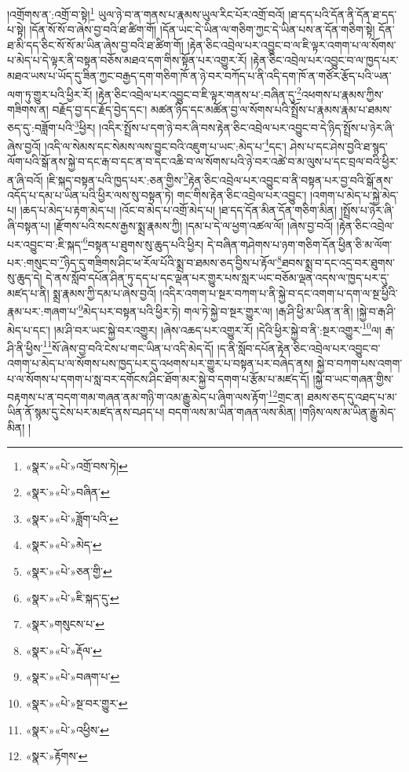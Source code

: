 །འགྲོགས་ན་:འགྲོ་བ་སྟེ།\footnote{«སྣར་»«པེ་»འགྲོ་བས་ཏེ།} ཡུལ་ཉེ་བ་ན་གནས་པ་རྣམས་ཡུལ་རིང་པོར་འགྲོ་བའོ། །ཐ་དད་པའི་དོན་ནི་དོན་ཐ་དད་པ་སྟེ། །དོན་སོ་སོ་བ་ཞེས་བྱ་བའི་ཐ་ཚིག་གོ། །དོན་ཡང་དེ་ཡིན་ལ་གཅིག་ཀྱང་དེ་ཡིན་པས་ན་དོན་གཅིག་སྟེ། དོན་ཐ་མི་དད་ཅིང་སོ་སོ་མ་ཡིན་ཞེས་བྱ་བའི་ཐ་ཚིག་གོ། །རྟེན་ཅིང་འབྲེལ་པར་འབྱུང་བ་ལ་ཇི་ལྟར་འགག་པ་ལ་སོགས་པ་མེད་པ་དེ་ལྟར་ནི་བསྟན་བཅོས་མཐའ་དག་གིས་སྟོན་པར་འགྱུར་རོ། །རྟེན་ཅིང་འབྲེལ་པར་འབྱུང་བ་ལ་ཁྱད་པར་མཐའ་ཡས་པ་ཡོད་དུ་ཟིན་ཀྱང་བརྒྱད་དག་གཅིག་ཁོ་ན་ཉེ་བར་བཀོད་པ་ནི་འདི་དག་ཁོ་ན་གཙོར་རྩོད་པའི་ཡན་ལག་ཏུ་གྱུར་པའི་ཕྱིར་རོ། །རྟེན་ཅིང་འབྲེལ་པར་འབྱུང་བ་ཇི་ལྟར་གནས་པ་:བཞིན་དུ་\footnote{«སྣར་»«པེ་»བཞིན་}འཕགས་པ་རྣམས་ཀྱིས་གཟིགས་ན། བརྗོད་བྱ་དང་རྗོད་བྱེད་དང་། མཚན་ཉིད་དང་མཚོན་བྱ་ལ་སོགས་པའི་སྤྲོས་པ་རྣམས་རྣམ་པ་ཐམས་ཅད་དུ་:བཟློག་པའི་\footnote{«སྣར་»«པེ་»ཟློག་པའི་}ཕྱིར། །འདིར་སྤྲོས་པ་དག་ཉེ་བར་ཞི་བས་རྟེན་ཅིང་འབྲེལ་པར་འབྱུང་བ་དེ་ཉིད་སྤྲོས་པ་ཉེར་ཞི་ཞེས་བྱའོ། །འདི་ལ་སེམས་དང་སེམས་ལས་བྱུང་བའི་འཇུག་པ་ཡང་:མེད་པ་\footnote{«སྣར་»«པེ་»མེད་}དང་། ཤེས་པ་དང་ཤེས་བྱའི་ཐ་སྙད་ལོག་པའི་སྒོ་ནས་སྐྱེ་བ་དང་རྒ་བ་དང་ན་བ་དང་འཆི་བ་ལ་སོགས་པའི་ཉེ་བར་འཚེ་བ་མ་ལུས་པ་དང་བྲལ་བའི་ཕྱིར་ན་ཞི་བའོ། །ཇི་སྐད་བསྟན་པའི་ཁྱད་པར་:ཅན་གྱིས་\footnote{«སྣར་»«པེ་»ཅན་གྱི་}རྟེན་ཅིང་འབྲེལ་པར་འབྱུང་བ་ནི་བསྟན་པར་བྱ་བའི་སྒོ་ནས་འདོད་པ་དམ་པ་ཡིན་པའི་ཕྱིར་ལས་སུ་བསྟན་ཏེ། གང་གིས་རྟེན་ཅིང་འབྲེལ་པར་འབྱུང་། །འགག་པ་མེད་པ་སྐྱེ་མེད་པ། །ཆད་པ་མེད་པ་རྟག་མེད་པ། །འོང་བ་མེད་པ་འགྲོ་མེད་པ། །ཐ་དད་དོན་མིན་དོན་གཅིག་མིན། །སྤྲོས་པ་ཉེར་ཞི་ཞི་བསྟན་པ། །རྫོགས་པའི་སངས་རྒྱས་སྨྲ་རྣམས་ཀྱི། །དམ་པ་དེ་ལ་ཕྱག་འཚལ་ལོ། །ཞེས་བྱ་བའོ། །རྟེན་ཅིང་འབྲེལ་པར་འབྱུང་བ་:ཇི་སྐད་\footnote{«སྣར་»«པེ་»ཇི་སྐད་དུ་}བསྟན་པ་ཐུགས་སུ་ཆུད་པའི་ཕྱིར། དེ་བཞིན་གཤེགས་པ་ཉག་གཅིག་དོན་ཕྱིན་ཅི་མ་ལོག་པར་:གསུང་བ་\footnote{«སྣར་»གསུངས་པ་}ཉིད་དུ་གཟིགས་ཤིང་ཕ་རོལ་པོའི་སྨྲ་བ་ཐམས་ཅད་བྱིས་པ་རྟོལ་\footnote{«སྣར་»«པེ་»རྡོལ་}ཐབས་སྨྲ་བ་དང་འདྲ་བར་ཐུགས་སུ་ཆུད་དེ། དེ་ནས་སློབ་དཔོན་ཤིན་ཏུ་དད་པ་དང་ལྡན་པར་གྱུར་པས་སླར་ཡང་བཅོམ་ལྡན་འདས་ལ་ཁྱད་པར་དུ་མཛད་པ་ནི། སྨྲ་རྣམས་ཀྱི་དམ་པ་ཞེས་བྱའོ། །འདིར་འགག་པ་སྔར་བཀག་པ་ནི་སྐྱེ་བ་དང་འགག་པ་དག་ལ་སྔ་ཕྱིའི་རྣམ་པར་:གཞག་པ་\footnote{«སྣར་»«པེ་»བཞག་པ་}མེད་པར་བསྟན་པའི་ཕྱིར་ཏེ། གལ་ཏེ་སྐྱེ་བ་སྔར་གྱུར་ལ། །རྒ་ཤི་ཕྱི་མ་ཡིན་ན་ནི། །སྐྱེ་བ་རྒ་ཤི་མེད་པ་དང་། །མ་ཤི་བར་ཡང་སྐྱེ་བར་འགྱུར། །ཞེས་འཆད་པར་འགྱུར་རོ། །དེའི་ཕྱིར་སྐྱེ་བ་ནི་:སྔར་འགྱུར་\footnote{«སྣར་»«པེ་»སྔ་བར་གྱུར་}ལ། རྒ་ཤི་ནི་ཕྱིས་\footnote{«སྣར་»«པེ་»འཕྱིས་}སོ་ཞེས་བྱ་བའི་ངེས་པ་གང་ཡིན་པ་འདི་མེད་དོ། །ད་ནི་སློབ་དཔོན་རྟེན་ཅིང་འབྲེལ་པར་འབྱུང་བ་འགག་པ་མེད་པ་ལ་སོགས་པས་ཁྱད་པར་དུ་འཕགས་པར་གྱུར་པ་བསྟན་པར་བཞེད་ནས། སྐྱེ་བ་བཀག་པས་འགག་པ་ལ་སོགས་པ་དགག་པ་སླ་བར་དགོངས་ཤིང་ཐོག་མར་སྐྱེ་བ་དགག་པ་རྩོམ་པ་མཛད་དོ། །སྐྱེ་བ་ཡང་གཞན་གྱིས་བརྟགས་པ་ན་བདག་གམ་གཞན་ནམ་གཉི་ག་འམ་རྒྱུ་མེད་པ་ཞིག་ལས་རྟོག་\footnote{«སྣར་»རྟོགས་}གྲང་ན། ཐམས་ཅད་དུ་འཐད་པ་མ་ཡིན་ནོ་སྙམ་དུ་ངེས་པར་མཛད་ནས་བཤད་པ། བདག་ལས་མ་ཡིན་གཞན་ལས་མིན། །གཉིས་ལས་མ་ཡིན་རྒྱུ་མེད་མིན། །
